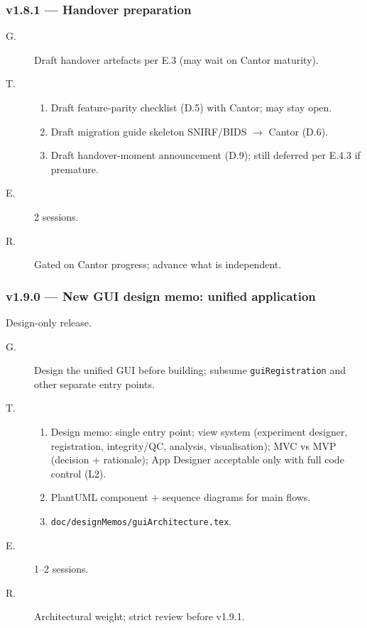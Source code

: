 \documentclass[11pt,a4paper]{article}
\begin{document}
\subsubsection*{v1.8.1 --- Handover preparation}

\begin{description}
    \item[G.] Draft handover artefacts per E.3 (may wait on Cantor maturity).
    \item[T.]
        \begin{enumerate}[nosep]
            \item Draft feature-parity checklist (D.5) with Cantor; may stay open.
            \item Draft migration guide skeleton SNIRF/BIDS $\to$ Cantor (D.6).
            \item Draft handover-moment announcement (D.9); still deferred per E.4.3 if premature.
        \end{enumerate}
    \item[E.] 2 sessions.
    \item[R.] Gated on Cantor progress; advance what is independent.
\end{description}

\subsubsection*{v1.9.0 --- New GUI design memo: unified application}

Design-only release.

\begin{description}
    \item[G.] Design the unified GUI before building; subsume \texttt{guiRegistration} and other separate entry points.
    \item[T.]
        \begin{enumerate}[nosep]
            \item Design memo: single entry point; view system (experiment designer, registration, integrity/QC, analysis, visualisation); MVC vs MVP (decision + rationale); App Designer acceptable only with full code control (L2).
            \item PlantUML component + sequence diagrams for main flows.
            \item \texttt{doc/designMemos/guiArchitecture.tex}.
        \end{enumerate}
    \item[E.] 1--2 sessions.
    \item[R.] Architectural weight; strict review before v1.9.1.
\end{description}
\end{document}
